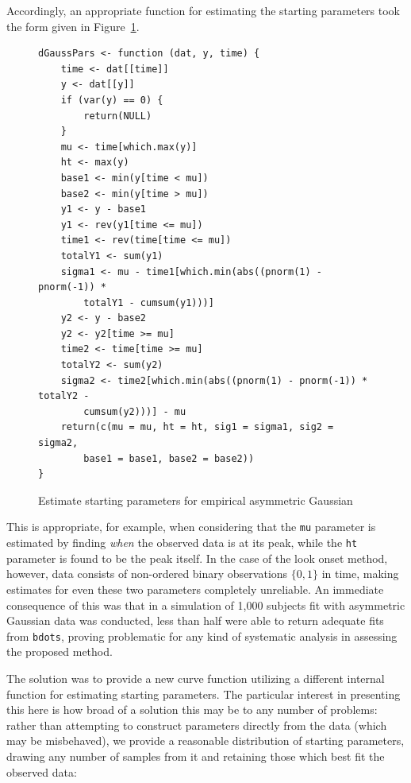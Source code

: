 \documentclass{article}
\newcommand{\xt}{\texttt}%
\begin{document}
Accordingly, an appropriate function for estimating the starting parameters took the form given in Figure~\ref{fig:gauss_form}.


\begin{singlespace}
\begin{figure}[H]
\centering
\begin{BVerbatim}
dGaussPars <- function (dat, y, time) {
    time <- dat[[time]]
    y <- dat[[y]]
    if (var(y) == 0) {
        return(NULL)
    }
    mu <- time[which.max(y)]
    ht <- max(y)
    base1 <- min(y[time < mu])
    base2 <- min(y[time > mu])
    y1 <- y - base1
    y1 <- rev(y1[time <= mu])
    time1 <- rev(time[time <= mu])
    totalY1 <- sum(y1)
    sigma1 <- mu - time1[which.min(abs((pnorm(1) - pnorm(-1)) * 
        totalY1 - cumsum(y1)))]
    y2 <- y - base2
    y2 <- y2[time >= mu]
    time2 <- time[time >= mu]
    totalY2 <- sum(y2)
    sigma2 <- time2[which.min(abs((pnorm(1) - pnorm(-1)) * totalY2 - 
        cumsum(y2)))] - mu
    return(c(mu = mu, ht = ht, sig1 = sigma1, sig2 = sigma2, 
        base1 = base1, base2 = base2))
}
\end{BVerbatim}
\caption{Estimate starting parameters for empirical asymmetric Gaussian}
\label{fig:gauss_form}
\end{figure}
\end{singlespace}

This is appropriate, for example, when considering that the \xt{mu} parameter is estimated by finding \textit{when} the observed data is at its peak, while the \xt{ht} parameter is found to be the peak itself. In the case of the look onset method, however, data consists of non-ordered binary observations $\{0,1\}$ in time, making estimates for even these two parameters completely unreliable. An immediate consequence of this was that in a simulation of 1,000 subjects fit with asymmetric Gaussian data was conducted, less than half were able to return adequate fits from \xt{bdots}, proving problematic for any kind of systematic analysis in assessing the proposed method.

The solution was to provide a new curve function utilizing a different internal function for estimating starting parameters. The particular interest in presenting this here is how broad of a solution this may be to any number of problems: rather than attempting to construct parameters directly from the data (which may be misbehaved), we provide a reasonable distribution of starting parameters, drawing any number of samples from it and retaining those which best fit the observed data:
\end{document}
